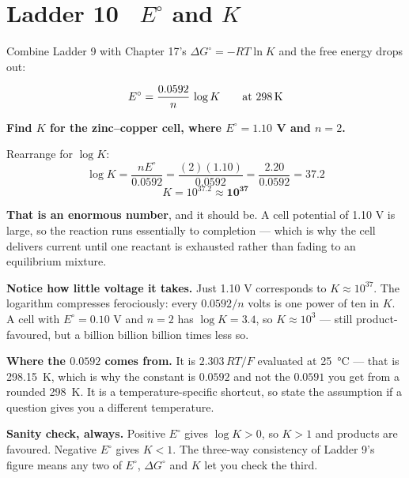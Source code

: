 \documentclass{apchem-worksheet}
\begin{document}
\section*{\sffamily Ladder 10 \textbullet\ $E^{\circ}$ and $K$}

Combine Ladder 9 with Chapter 17's $\Delta G^{\circ} = -RT\ln K$ and the
free energy drops out:

\[ E^{\circ} = \frac{0.0592}{n}\,\log K
   \qquad\text{at \SI{298}{\kelvin}} \]

\begin{workedexample}
\textbf{Find $K$ for the zinc--copper cell, where $E^{\circ} = 1.10$ V
and $n = 2$.}

Rearrange for $\log K$:
\[ \log K = \frac{n E^{\circ}}{0.0592}
          = \frac{(2)(1.10)}{0.0592}
          = \frac{2.20}{0.0592} = 37.2 \]
\[ K = 10^{37.2} \approx \mathbf{10^{37}} \]

\textbf{That is an enormous number}, and it should be. A cell potential
of 1.10 V is large, so the reaction runs essentially to completion ---
which is why the cell delivers current until one reactant is exhausted
rather than fading to an equilibrium mixture.

\textbf{Notice how little voltage it takes.} Just 1.10 V corresponds to
$K \approx 10^{37}$. The logarithm compresses ferociously: every
$0.0592/n$ volts is one power of ten in $K$. A cell with
$E^{\circ} = 0.10$ V and $n = 2$ has $\log K = 3.4$, so $K \approx
10^{3}$ --- still product-favoured, but a billion billion billion times
less so.

\textbf{Where the $0.0592$ comes from.} It is $2.303\,RT/F$ evaluated at
\SI{25}{\celsius} --- that is \SI{298.15}{\kelvin}, which is why the
constant is $0.0592$ and not the $0.0591$ you get from a rounded
\SI{298}{\kelvin}. It is a temperature-specific shortcut, so state the
assumption if a question gives you a different temperature.

\textbf{Sanity check, always.} Positive $E^{\circ}$ gives
$\log K > 0$, so $K > 1$ and products are favoured. Negative
$E^{\circ}$ gives $K < 1$. The three-way consistency of Ladder 9's
figure means any two of $E^{\circ}$, $\Delta G^{\circ}$ and $K$ let you
check the third.
\end{workedexample}
\end{document}
